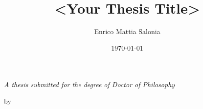 \documentclass[12pt, a4paper]{report}
\title{<Your Thesis Title>}
\author{Enrico Mattia Salonia}
\date{\today}  %
\begin{document}

\begin{titlepage}
	\centering
	\makeatletter                   %
	{\Huge\bfseries \@title\par}\vspace{2cm}

	{\Large \textit{A thesis submitted for the degree of Doctor of Philosophy}\par}\vspace{1.5cm}

	{\Large by\par}\vspace{0.5cm}
	{\Large\bfseries \@author\par}\vfill   %

	{\@date}                        %
	\makeatother                    %
\end{titlepage}


\cleardoublepage

\setcounter{page}{2} %
\tableofcontents
\cleardoublepage








\appendix








\end{document}
